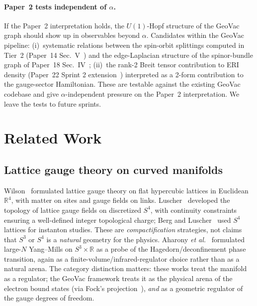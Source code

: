 \documentclass[aps,pra,twocolumn,superscriptaddress,longbibliography]{revtex4-2}
\begin{document}
\paragraph*{Paper~2 tests independent of $\alpha$.} If the Paper~2
interpretation holds, the $U(1)$-Hopf structure of the GeoVac graph
should show up in observables beyond $\alpha$.  Candidates within
the GeoVac pipeline: (i)~systematic relations between the spin-orbit
splittings computed in Tier~2 (Paper~14 Sec.~V~\cite{Paper14}) and
the edge-Laplacian structure of the spinor-bundle graph of
Paper~18 Sec.~IV~\cite{Paper18}; (ii)~the rank-2 Breit tensor
contribution to ERI density (Paper~22 Sprint 2
extension~\cite{Paper22}) interpreted as a 2-form contribution to
the gauge-sector Hamiltonian.  These are testable against the
existing GeoVac codebase and give $\alpha$-independent pressure on
the Paper~2 interpretation.  We leave the tests to future sprints.


\section{Related Work}
\label{sec:relatedwork}

\subsection{Lattice gauge theory on curved manifolds}

Wilson~\cite{Wilson1974} formulated lattice gauge theory on flat
hypercubic lattices in Euclidean $\mathbb{R}^4$, with matter on sites
and gauge fields on links.  Luscher~\cite{Luscher1982} developed the
topology of lattice gauge fields on discretized $S^4$, with
continuity constraints ensuring a well-defined integer topological
charge; Berg and Luscher~\cite{BergLuscher1981} used $S^4$ lattices
for instanton studies.  These are \emph{compactification} strategies,
not claims that $S^3$ or $S^4$ is a \emph{natural} geometry for the
physics.  Aharony \emph{et al.}~\cite{Aharony2004} formulated large-$N$
Yang--Mills on $S^3 \times \mathbb{R}$ as a probe of the
Hagedorn/deconfinement phase transition, again as a
finite-volume/infrared-regulator choice rather than as a natural
arena.  The category distinction matters: these works treat the
manifold as a regulator; the GeoVac framework treats it as the
physical arena of the electron bound states (via Fock's
projection~\cite{Fock1935}), \emph{and} as a geometric regulator of
the gauge degrees of freedom.
\end{document}
